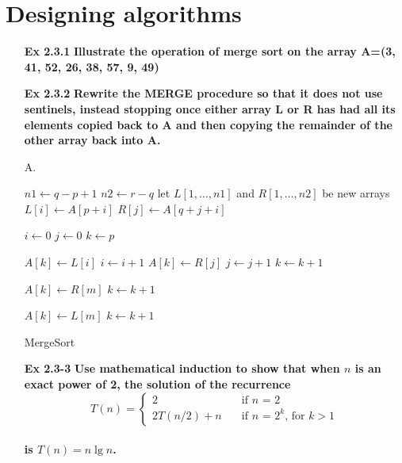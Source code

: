 \documentclass[fontsize=12pt,paper=a4,open=any]{book}
\begin{document}
\section{Designing algorithms}
\begin{enumerate}
	\item[\textbf{Ex 2.3.1}]
		\textbf{Illustrate the operation of merge sort on the array A=(3, 41, 52, 26, 38, 57, 9, 49)}

	\item[\textbf{Ex 2.3.2}]
		\textbf{Rewrite the MERGE procedure so that it does not use sentinels, instead stopping once either array L or R has had all its elements copied back to A and then copying the remainder of the other array back into A.}

	\item[A.]
		\begin{algorithm}[H]

			$n1 \longleftarrow q-p+1$\;
			$n2 \longleftarrow r-q$\;
			let $L[1,\dots,n1]$ and $R[1,\dots,n2]$ be new arrays\;
			{
				$L[i] \longleftarrow A[p+i]$\;
			}
			{
				$R[j] \longleftarrow A[q+j+i]$\;
			}

			$i \longleftarrow 0$\;
			$j \longleftarrow 0$\;
			$k \longleftarrow p$\;

			{
				{
					$A[k] \longleftarrow L[i]$\;
					$i \longleftarrow i+1$\;
				}
				\Else
				{
					$A[k] \longleftarrow R[j]$\;
					$j \longleftarrow j+1$\;
				}
				$k \longleftarrow k+1$\;
			}
			
			{
				{
					$A[k] \longleftarrow R[m]$\;
					$k \longleftarrow k+1$\;
				}
			}

			{
				{
					$A[k] \longleftarrow L[m]$\;
					$k \longleftarrow k+1$\;
				}
			}
			\caption{MergeSort}
		\end{algorithm}
		
	\item[\textbf{Ex 2.3-3}]
		\textbf{Use mathematical induction to show that when $n$ is an exact power of 2, the solution of the recurrence\\
		\[ T(n) = \begin{cases} 2 & \quad \text{if $n$ = 2}\\ 
			2T(n/2)+n & \quad \text{if $n$ = $2^k$, for $k>1$} \end{cases} \] \\
			is $T(n) = n \lg n$.
			}
			

\end{enumerate}
\end{document}
